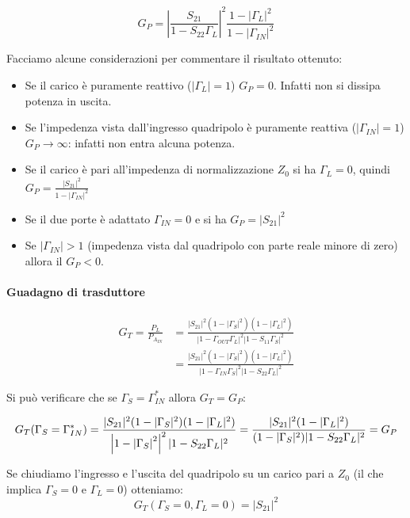 \begin{equation}\label{eq:gp}
G_P = 
\left| \frac{S_{21}}{1 - S_{22}\Gamma_L} \right|^2
\frac{1- |\Gamma_L|^2}{1- |\Gamma_{IN}|^2}
\end{equation}

Facciamo alcune considerazioni per commentare il risultato ottenuto:

\begin{itemize}
	\item Se il carico è puramente reattivo ($|\Gamma_L| = 1$) $G_P = 0$. Infatti non si dissipa potenza in uscita.
	\item Se l'impedenza vista dall'ingresso quadripolo è puramente reattiva ($|\Gamma_{IN}| = 1$) $G_P \rightarrow \infty$: infatti non entra alcuna potenza.
	\item  Se il carico è pari all'impedenza di normalizzazione $Z_0$ si ha $\Gamma_L = 0$, quindi $G_P = \frac{|S_{21}|^2}{1-|\Gamma_{IN}|^2}$
	\item Se il due porte è adattato $\Gamma_{IN} = 0$ e si ha $G_P = |S_{21}|^2$
	\item Se $|\Gamma_{IN}|>1$ (impedenza vista dal quadripolo con parte reale minore di zero) allora il $G_P < 0$.
\end{itemize}

\paragraph{Guadagno di trasduttore}

\begin{equation}
\begin{aligned}
G_T = \frac{P_L}{P_{A_{IN}}} &= 
\frac{|S_{21}|^2(1-|\Gamma_S|^2)(1-|\Gamma_L|^2)}
{|1-\Gamma_{OUT}\Gamma_L|^2|1-S_{11}\Gamma_S|^2}\\
&=
\frac{|S_{21}|^2(1-|\Gamma_S|^2)(1-|\Gamma_L|^2)}
{|1-\Gamma_{IN}\Gamma_S|^2|1-S_{22}\Gamma_L|^2}
\end{aligned}
\end{equation}

Si può verificare che se $\Gamma_S = \Gamma_{IN}^*$ allora $G_T = G_P$:

$$
G_T(\Gamma_S = \Gamma_{IN}^*) = \frac{|S_{21}|^2(1-|\Gamma_S|^2)(1-|\Gamma_L|^2)}
{\left|1-\left|\Gamma_S\right|^2\right|^2|1-S_{22}\Gamma_L|^2}
= 
\frac{|S_{21}|^2(1-|\Gamma_L|^2)}
{(1-|\Gamma_S|^2)|1-S_{22}\Gamma_L|^2} = G_P
$$

Se chiudiamo l'ingresso e l'uscita del quadripolo su un carico pari a $Z_0$ (il che implica $\Gamma_S = 0$ e $\Gamma_L = 0$) otteniamo:
\[G_T(\Gamma_S = 0, \Gamma_L = 0) = |S_{21}|^2 \]

